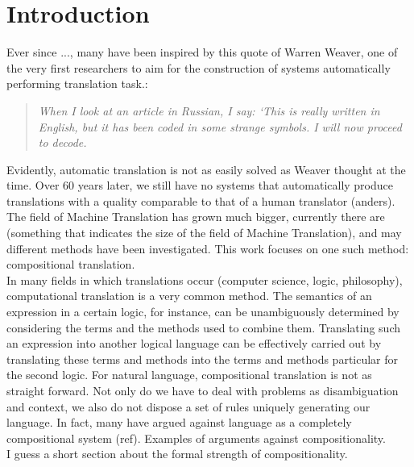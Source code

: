 \documentclass{report}
\author{}
\title{}
\theoremstyle{indented}
\begin{document}
\maketitle
\tableofcontents

\chapter{Introduction}

Ever since ..., many have been inspired by this quote of Warren Weaver, one of the very first researchers to aim for the construction of systems automatically performing translation task.:

\begin{quote}
\textit{When I look at an article in Russian, I say: `This is really written in English, but it has been coded in some strange symbols. I will now proceed to decode.}
\end{quote}

Evidently, automatic translation is not as easily solved as Weaver thought at the time. Over 60 years later, we still have no systems that automatically produce translations with a quality comparable to that of a human translator (anders). The field of Machine Translation has grown much bigger, currently there are (something that indicates the size of the field of Machine Translation), and may different methods have been investigated. This work focuses on one such method: compositional translation.\\
In many fields in which translations occur (computer science, logic, philosophy), computational translation is a very common method. The semantics of an expression in a certain logic, for instance, can be unambiguously determined by considering the terms and the methods used to combine them. Translating such an expression into another logical language can be effectively carried out by translating these terms and methods into the terms and methods particular for the second logic. For natural language, compositional translation is not as straight forward.
Not only do we have to deal with problems as disambiguation and context, we also do not dispose a set of rules uniquely generating our language. In fact, many have argued against language as a completely compositional system (ref). Examples of arguments against compositionality.\\
I guess a short section about the formal strength of compositionality.
\end{document}
